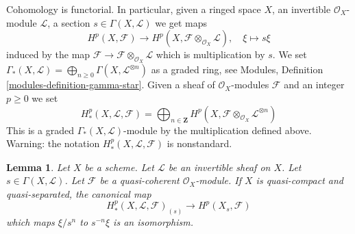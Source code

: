 \documentclass{stacks-project}
\theoremstyle{plain}
\newtheorem{lemma}[subsection]{Lemma}
\theoremstyle{definition}
\theoremstyle{remark}
\numberwithin{equation}{subsection}
\begin{document}
\noindent
Cohomology is functorial. In particular, given a ringed space $X$,
an invertible $\mathcal{O}_X$-module $\mathcal{L}$, a section
$s \in \Gamma(X, \mathcal{L})$ we get maps
$$
H^p(X, \mathcal{F})
\longrightarrow
H^p(X, \mathcal{F} \otimes_{\mathcal{O}_X} \mathcal{L}), \quad
\xi \longmapsto s\xi
$$
induced by the map
$\mathcal{F} \to \mathcal{F} \otimes_{\mathcal{O}_X} \mathcal{L}$
which is multiplication by $s$. We set
$\Gamma_*(X, \mathcal{L}) =
\bigoplus_{n \geq 0} \Gamma(X, \mathcal{L}^{\otimes n})$
as a graded ring, see
Modules, Definition \ref{modules-definition-gamma-star}.
Given a sheaf of $\mathcal{O}_X$-modules $\mathcal{F}$ and an integer
$p \geq 0$ we set
$$
H^p_*(X, \mathcal{L}, \mathcal{F}) =
\bigoplus\nolimits_{n \in \mathbf{Z}} H^p(X,
\mathcal{F} \otimes_{\mathcal{O}_X} \mathcal{L}^{\otimes n})
$$
This is a graded $\Gamma_*(X, \mathcal{L})$-module by the multiplication
defined above. Warning: the notation $H^p_*(X, \mathcal{L}, \mathcal{F})$
is nonstandard.

\begin{lemma}
\label{lemma-invert-s-cohomology}
Let $X$ be a scheme. Let $\mathcal{L}$ be an invertible sheaf on $X$.
Let $s \in \Gamma(X, \mathcal{L})$.
Let $\mathcal{F}$ be a quasi-coherent $\mathcal{O}_X$-module.
If $X$ is quasi-compact and quasi-separated, the canonical map
$$
H^p_*(X, \mathcal{L}, \mathcal{F})_{(s)}
\longrightarrow
H^p(X_s, \mathcal{F})
$$
which maps $\xi/s^n$ to $s^{-n}\xi$ is an isomorphism.
\end{lemma}
\end{document}
